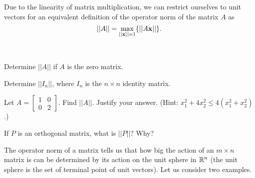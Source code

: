 Due to the linearity of matrix multiplication, we can restrict ourselves to unit vectors for an equivalent definition of the operator norm of the matrix $A$ as
\[||A|| = \displaystyle \max_{||\mathbf{x}|| = 1}\{||A\mathbf{x}||\}.\]

\begin{pa} \label{pa:7_c_1} ~
\be
	\item Determine $||A||$ if $A$ is the zero matrix. 

\item Determine $||I_n||$, where $I_n$ is the $n \times n$ identity matrix. 


\item Let $A = \left[ \begin{array}{cc} 1&0\\0&2 \end{array} \right]$. Find $||A||$. Justify your answer. (Hint: $x_1^2+4x_2^2 \leq 4(x_1^2 + x_2^2)$.)


\item  If $P$ is an orthogonal matrix, what is $||P||$? Why?

 
\ee
\end{pa}


The operator norm of a matrix tells us that how big the action of an $m \times n$ matrix is can be determined by its action on the unit sphere in $\mathbb{R}^n$ (the unit sphere is the set of terminal point of unit vectors). Let us consider two examples.

